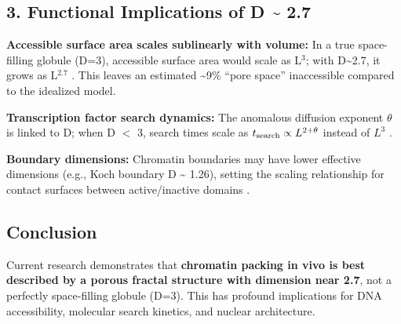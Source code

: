 \subsection*{3. Functional Implications of D {\textasciitilde} 2.7}

\textbf{Accessible surface area scales sublinearly with volume:}
In a true space-filling globule (D=3), accessible surface area would scale as L$^3$; with D{\textasciitilde}2.7, it grows as L$^{2.7}$ \cite{Almassalha2017The,Almassalha2017Macrogenomic}. This leaves an estimated {\textasciitilde}9\% ``pore space'' inaccessible compared to the idealized model.

\textbf{Transcription factor search dynamics:}
The anomalous diffusion exponent $\theta$ is linked to D; when D $<$ 3, search times scale as $t_{\rm search} \propto L^{2+\theta}$ instead of $L^3$ \cite{Bancaud2012A,Bancaud2009Molecular}.

\textbf{Boundary dimensions:}
Chromatin boundaries may have lower effective dimensions (e.g., Koch boundary D {\textasciitilde} 1.26), setting the scaling relationship for contact surfaces between active/inactive domains \cite{Li2022Analysis}.

\subsection*{Conclusion}

Current research demonstrates that \textbf{chromatin packing in vivo is best described by a porous fractal structure with dimension near 2.7}, not a perfectly space-filling globule (D=3). This has profound implications for DNA accessibility, molecular search kinetics, and nuclear architecture.




